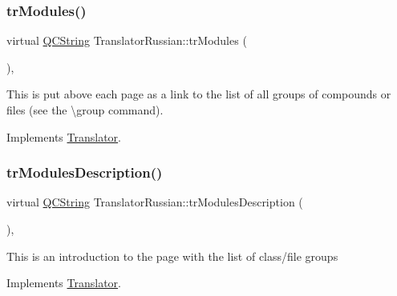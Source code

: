 \mbox{\label{class_translator_russian_a2c0ecbeba16f11c52f028d835ec0f26f}} 
\subsubsection{\texorpdfstring{trModules()}{trModules()}}
{\footnotesize\ttfamily virtual \mbox{\hyperlink{class_q_c_string}{Q\+C\+String}} Translator\+Russian\+::tr\+Modules (\begin{DoxyParamCaption}{ }\end{DoxyParamCaption})\hspace{0.3cm}{\ttfamily [inline]}, {\ttfamily [virtual]}}

This is put above each page as a link to the list of all groups of compounds or files (see the \textbackslash{}group command). 

Implements \mbox{\hyperlink{class_translator}{Translator}}.

\mbox{\label{class_translator_russian_a05e91d4475afd96b64d5f062c9653a7f}} 
\subsubsection{\texorpdfstring{trModulesDescription()}{trModulesDescription()}}
{\footnotesize\ttfamily virtual \mbox{\hyperlink{class_q_c_string}{Q\+C\+String}} Translator\+Russian\+::tr\+Modules\+Description (\begin{DoxyParamCaption}{ }\end{DoxyParamCaption})\hspace{0.3cm}{\ttfamily [inline]}, {\ttfamily [virtual]}}

This is an introduction to the page with the list of class/file groups 

Implements \mbox{\hyperlink{class_translator}{Translator}}.

\mbox{\label{class_translator_russian_a3e76774dc9cd6fb260037ccc94bd30f6}} 

